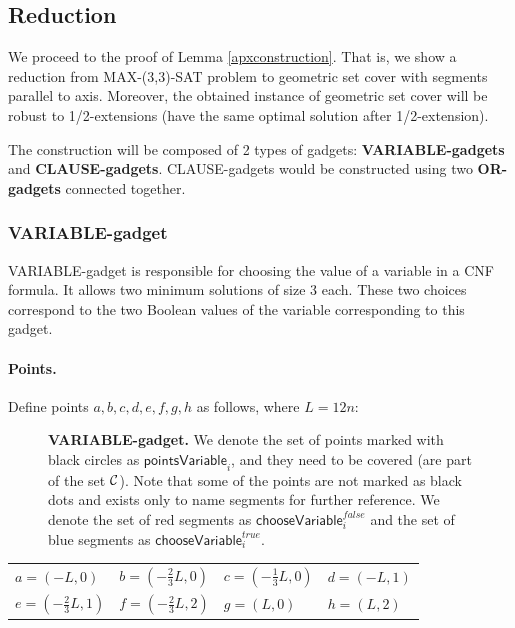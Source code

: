 \subsection{Reduction}
\label{construction_description}
We proceed to the proof of Lemma \ref{apxconstruction}.
That is, we show a reduction from MAX-(3,3)-SAT problem
to geometric set cover with segments
parallel to axis. Moreover, the obtained instance
of geometric set cover will be robust
to 1/2-extensions (have the same optimal solution
after 1/2-extension).

The construction will be composed of 2 types of gadgets:
\textbf{VARIABLE-gadgets} and \textbf{CLAUSE-gadgets}.
CLAUSE-gadgets would be constructed using two \textbf{OR-gadgets}
connected together.

\subsubsection{VARIABLE-gadget}

VARIABLE-gadget is responsible for choosing the value of a variable
in a CNF formula. It allows two minimum solutions of size 3 each.
These two choices correspond to the two Boolean values of the variable
corresponding to this gadget.

\paragraph{Points.}

Define points $a,b,c,d,e,f,g,h$ as follows, where $L = 12n$:


\newcommand{\pointsVarNoArg}{\mathsf{pointsVariable} }
\newcommand{\pointsVar}[1]{\mathsf{pointsVariable}_{#1} }
\newcommand{\chooseVar}[2]{\mathsf{chooseVariable}^{#1}_{#2} }
\newcommand{\segmentsVar}[1]{\mathsf{segmentsVariable}_{#1} }

\begin{figure}[h]
\centering
\def\svgwidth{0.5\columnwidth}

\caption{\textbf{VARIABLE-gadget.}
We denote the set of points marked with black circles as $\pointsVar{i}$,
and they need to be covered (are part of the set $\mathcal{C}$).
Note that some of the points are not marked as black dots
and exists only to name segments for further reference.
We denote the set of red segments as $\chooseVar{false}{i}$
and the set of blue segments as $\chooseVar{true}{i}$.}
\label{fig:apx_choose_variable}
\end{figure}

\begin{center}
\begin{tabular}{ l l l l}
	$a = (-L, 0)$ &
	$b = (-\frac{2}{3}L, 0)$ & 
	$c = (-\frac{1}{3}L, 0)$ & 
	$d = (-L, 1)$ \\  
	$e = (-\frac{2}{3}L, 1)$ & 
	$f = (-\frac{2}{3}L, 2)$ &
	$g = (L, 0)$ &
	$h = (L, 2)$
\end{tabular}
\end{center}


